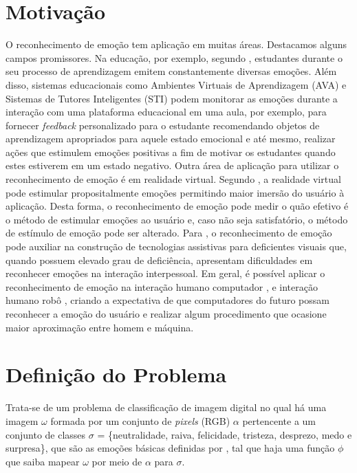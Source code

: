 \section{Motivação}
O reconhecimento de emoção tem aplicação em muitas áreas. Destacamos alguns campos promissores. Na educação, por exemplo, segundo \cite{jaques2013ambientes}, estudantes durante o seu processo de aprendizagem emitem constantemente diversas emoções. Além disso, sistemas educacionais como Ambientes Virtuais de Aprendizagem (AVA) e Sistemas de Tutores Inteligentes (STI) podem monitorar as emoções durante a interação com uma plataforma educacional em uma aula, por exemplo, para fornecer \textit{feedback} personalizado para o estudante recomendando objetos de aprendizagem apropriados para aquele estado emocional e até mesmo, realizar ações que estimulem emoções positivas a fim de motivar os estudantes quando estes estiverem em um estado negativo. Outra área de aplicação para utilizar o reconhecimento de emoção é em realidade virtual. Segundo \cite{riva2007affective}, a realidade virtual pode estimular propositalmente emoções permitindo maior imersão do usuário à aplicação. Desta forma, o reconhecimento de emoção pode medir o quão efetivo é o método de estimular emoções ao usuário e, caso não seja satisfatório, o método de estímulo de emoção pode ser alterado. Para \cite{li2015deep}, o reconhecimento de emoção pode auxiliar na construção de tecnologias assistivas para deficientes visuais que, quando possuem elevado grau de deficiência, apresentam dificuldades em reconhecer emoções na interação interpessoal. Em geral, é possível aplicar o reconhecimento de emoção na interação humano computador \citep{chen2017convolution,wen2017ensemble,liu2016facial, barsoum2016training}, e interação humano robô \citep{shin2016baseline,jung2015development}, criando a expectativa de que computadores do futuro possam reconhecer a emoção do usuário e realizar algum procedimento que ocasione maior aproximação entre homem e máquina.    

\section{Definição do Problema}\label{sec:problema}
Trata-se de um problema de classificação de imagem digital no qual há uma imagem $\omega$ formada por um conjunto de \textit{pixels} (RGB) $\alpha$ pertencente a um conjunto de classes $\sigma$ = \{neutralidade, raiva, felicidade, tristeza, desprezo, medo e surpresa\}, que são as emoções básicas definidas por \citep{ekman1994}, tal que haja uma função $\phi$ que saiba mapear $\omega$ por meio de $\alpha$ para $\sigma$.  

